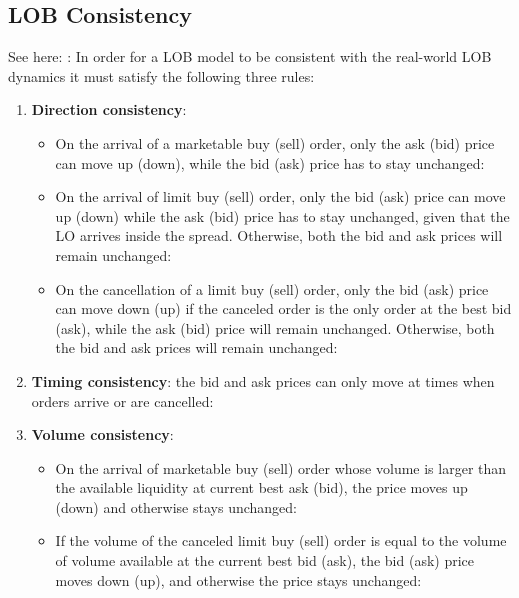 \documentclass[12pt,a4paper]{cau_thesis}
\begin{document}
\subsection{LOB Consistency}\label{sub_sec:lob_consistency}
See here: \cite[][, p.36]{korhonen2025market}: In order for a LOB
model to be consistent with the real-world LOB dynamics it must
satisfy the following three rules:
\begin{enumerate}
    \item \textbf{Direction consistency}:
          \begin{itemize}
              \item On the arrival of a marketable buy (sell) order, only the ask (bid)
                    price can move up (down), while the bid (ask) price has to stay
                    unchanged:
              \item On the arrival of limit buy (sell) order, only the bid (ask) price
                    can move up (down) while the ask (bid) price has to stay unchanged,
                    given that the LO arrives inside the spread. Otherwise, both the bid
                    and ask prices will remain unchanged:
              \item On the cancellation of a limit buy (sell) order, only the bid (ask)
                    price can move down (up) if the canceled order is the only order at
                    the best bid (ask), while the ask (bid) price will remain unchanged.
                    Otherwise, both the bid and ask prices will remain unchanged:
          \end{itemize}
    \item \textbf{Timing consistency}: the bid and ask prices can only move at times when orders
          arrive or are cancelled:
    \item \textbf{Volume consistency}:
          \begin{itemize}
              \item On the arrival of marketable buy (sell) order whose volume is larger
                    than the available liquidity at current best ask (bid), the price
                    moves up (down) and otherwise stays unchanged:
              \item If the volume of the canceled limit buy (sell) order is equal to the
                    volume of volume available at the current best bid (ask), the bid
                    (ask) price moves down (up), and otherwise the price stays unchanged:
          \end{itemize}
\end{enumerate}
\end{document}
